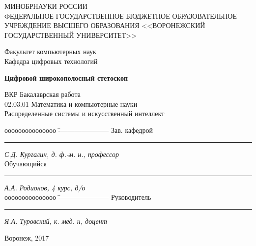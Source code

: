 \documentclass[../paper.tex]{subfiles}
\begin{document}
\thispagestyle{empty}
\center 
\textsc{МИНОБРНАУКИ РОССИИ}\\
\textsc{ФЕДЕРАЛЬНОЕ ГОСУДАРСТВЕННОЕ БЮДЖЕТНОЕ ОБРАЗОВАТЕЛЬНОЕ УЧРЕЖДЕНИЕ ВЫСШЕГО ОБРАЗОВАНИЯ <<ВОРОНЕЖСКИЙ ГОСУДАРСТВЕННЫЙ УНИВЕРСИТЕТ>>}

\vspace{0.3cm}

\textrm{Факультет компьютерных наук}\\
\textrm{Кафедра цифровых технологий}

\vspace{1cm}

\textbf{Цифровой широкополосный стетоскоп}\\

\vspace{1cm}

\textrm{ВКР Бакалаврская работа}\\
\textrm{02.03.01 Математика и компьютерные науки}\\
\textrm{Распределенные системы и искусственный интеллект}\\

\vfill
{}
\begin{tabbing}
ооооооооооооооо	\=	----------------------	\kill
Зав. кафедрой	\> 	\rule[0mm]{5cm}{0,3mm}	\textit{С.Д. Кургалин, д. ф.-м. н., профессор}  \\
Обучающийся 	\> 	\rule[0mm]{5cm}{0,3mm}	\textit{А.А. Родионов, 4 курс, д/о} \\ 
ооооооооооооооо	\=	----------------------	\kill
Руководитель	\> 	\rule[0mm]{5cm}{0,3mm}  \textit{Я.А. Туровский, к. мед. н, доцент}
\end{tabbing}

\vfill

\centerline{Воронеж, 2017}
\clearpage
\end{document}
